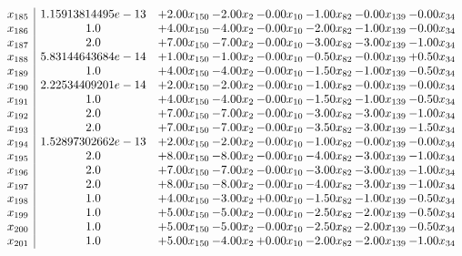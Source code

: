 \documentclass[8pt]{article}
\begin{document}
\[\begin{array}{c| c c@{\hskip 2pt} c@{\hskip 2pt} c@{\hskip 2pt} c@{\hskip 2pt} c@{\hskip 2pt} c@{\hskip 2pt} }
 x_{185}   &  1.15913814495e-13 & +  2.00 x_{150} & -2.00 x_{2} & -0.00 x_{10} & -1.00 x_{82} & -0.00 x_{139} & -0.00 x_{34}\\
 x_{186}   &  1.0 & +  4.00 x_{150} & -4.00 x_{2} & -0.00 x_{10} & -2.00 x_{82} & -1.00 x_{139} & -0.00 x_{34}\\
 x_{187}   &  2.0 & +  7.00 x_{150} & -7.00 x_{2} & -0.00 x_{10} & -3.00 x_{82} & -3.00 x_{139} & -1.00 x_{34}\\
 x_{188}   &  5.83144643684e-14 & +  1.00 x_{150} & -1.00 x_{2} & -0.00 x_{10} & -0.50 x_{82} & -0.00 x_{139} & +  0.50 x_{34}\\
 x_{189}   &  1.0 & +  4.00 x_{150} & -4.00 x_{2} & -0.00 x_{10} & -1.50 x_{82} & -1.00 x_{139} & -0.50 x_{34}\\
 x_{190}   &  2.22534409201e-14 & +  2.00 x_{150} & -2.00 x_{2} & -0.00 x_{10} & -1.00 x_{82} & -0.00 x_{139} & -0.00 x_{34}\\
 x_{191}   &  1.0 & +  4.00 x_{150} & -4.00 x_{2} & -0.00 x_{10} & -1.50 x_{82} & -1.00 x_{139} & -0.50 x_{34}\\
 x_{192}   &  2.0 & +  7.00 x_{150} & -7.00 x_{2} & -0.00 x_{10} & -3.00 x_{82} & -3.00 x_{139} & -1.00 x_{34}\\
 x_{193}   &  2.0 & +  7.00 x_{150} & -7.00 x_{2} & -0.00 x_{10} & -3.50 x_{82} & -3.00 x_{139} & -1.50 x_{34}\\
 x_{194}   &  1.52897302662e-13 & +  2.00 x_{150} & -2.00 x_{2} & -0.00 x_{10} & -1.00 x_{82} & -0.00 x_{139} & -0.00 x_{34}\\
 x_{195}   &  2.0 & +  8.00 x_{150} & -8.00 x_{2} & -0.00 x_{10} & -4.00 x_{82} & -3.00 x_{139} & -1.00 x_{34}\\
 x_{196}   &  2.0 & +  7.00 x_{150} & -7.00 x_{2} & -0.00 x_{10} & -3.00 x_{82} & -3.00 x_{139} & -1.00 x_{34}\\
 x_{197}   &  2.0 & +  8.00 x_{150} & -8.00 x_{2} & -0.00 x_{10} & -4.00 x_{82} & -3.00 x_{139} & -1.00 x_{34}\\
 x_{198}   &  1.0 & +  4.00 x_{150} & -3.00 x_{2} & +  0.00 x_{10} & -1.50 x_{82} & -1.00 x_{139} & -0.50 x_{34}\\
 x_{199}   &  1.0 & +  5.00 x_{150} & -5.00 x_{2} & -0.00 x_{10} & -2.50 x_{82} & -2.00 x_{139} & -0.50 x_{34}\\
 x_{200}   &  1.0 & +  5.00 x_{150} & -5.00 x_{2} & -0.00 x_{10} & -2.50 x_{82} & -2.00 x_{139} & -0.50 x_{34}\\
 x_{201}   &  1.0 & +  5.00 x_{150} & -4.00 x_{2} & +  0.00 x_{10} & -2.00 x_{82} & -2.00 x_{139} & -1.00 x_{34}\\

\end{array}\]
\end{document}
